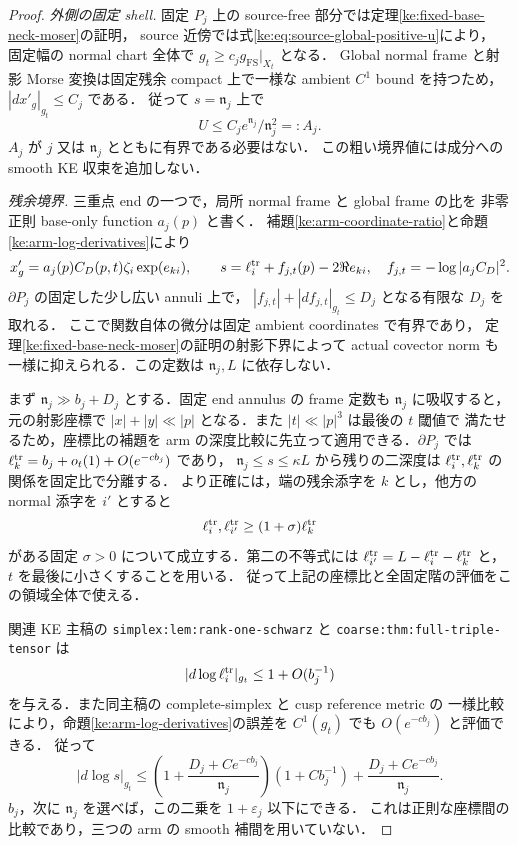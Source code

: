 \begin{proof}
\emph{外側の固定 shell.}
固定 $P_j$ 上の source-free 部分では定理\ref{ke:fixed-base-neck-moser}の証明，
source 近傍では式\eqref{ke:eq:source-global-positive-u}により，
固定幅の normal chart 全体で $g_t\ge c_jg_{\mathrm{FS}}|_{X_t}$ となる．
Global normal frame と射影 Morse 変換は固定残余 compact 上で一様な
ambient $C^1$ bound を持つため，$|dx'_g|_{g_t}\le C_j$ である．
従って $s=\mathfrak n_j$ 上で
\[
 U\le C_j e^{\mathfrak n_j}/\mathfrak n_j^2=:A_j.
\]
$A_j$ が $j$ 又は $\mathfrak n_j$ とともに有界である必要はない．
この粗い境界値には成分への smooth KE 収束を追加しない．

\emph{残余境界.}
三重点 end の一つで，局所 normal frame と global frame の比を
非零正則 base-only function $a_j(p)$ と書く．
補題\ref{ke:arm-coordinate-ratio}と命題\ref{ke:arm-log-derivatives}により
\[
 x'_g=a_j(p)C_D(p,t)\zeta_i\exp(e_{ki}),
 \qquad
 s=\ell_i^{\rm tr}+f_{j,t}(p)-2\Re e_{ki},
 \quad f_{j,t}=-\log|a_jC_D|^2.
\]
$\partial P_j$ の固定した少し広い annuli 上で，
$|f_{j,t}|+|df_{j,t}|_{g_t}\le D_j$ となる有限な $D_j$ を取れる．
ここで関数自体の微分は固定 ambient coordinates で有界であり，
定理\ref{ke:fixed-base-neck-moser}の証明の射影下界によって
actual covector norm も一様に抑えられる．この定数は $\mathfrak n_j,L$ に依存しない．

まず $\mathfrak n_j\gg b_j+D_j$ とする．固定 end annulus の frame 定数も $\mathfrak n_j$ に吸収すると，
元の射影座標で $|x|+|y|\ll|p|$ となる．また $|t|\ll|p|^3$ は最後の $t$ 閾値で
満たせるため，座標比の補題を arm の深度比較に先立って適用できる．$\partial P_j$ では
$\ell_k^{\rm tr}=b_j+o_t(1)+O(e^{-c b_j})$ であり，
$\mathfrak n_j\le s\le\kappa L$ から残りの二深度は
$\ell_i^{\rm tr},\ell_k^{\rm tr}$ の関係を固定比で分離する．
より正確には，端の残余添字を $k$ とし，他方の normal 添字を $i'$ とすると
\[
 \ell_i^{\rm tr},\ell_{i'}^{\rm tr}
 \ge(1+\sigma)\ell_k^{\rm tr}
\]
がある固定 $\sigma>0$ について成立する．第二の不等式には
$\ell_{i'}^{\rm tr}=L-\ell_i^{\rm tr}-\ell_k^{\rm tr}$ と，
$t$ を最後に小さくすることを用いる．
従って上記の座標比と全固定階の評価をこの領域全体で使える．

関連 KE 主稿\cite{KELocalCurrent}の
\texttt{simplex:lem:rank-one-schwarz} と
\texttt{coarse:thm:full-triple-tensor} は
\[
 |d\log\ell_i^{\rm tr}|_{g_t}\le1+O(b_j^{-1})
\]
を与える．また同主稿の complete-simplex と cusp reference metric の
一様比較により，命題\ref{ke:arm-log-derivatives}の誤差を
$C^1(g_t)$ でも $O(e^{-c b_j})$ と評価できる．
従って
\[
 |d\log s|_{g_t}
 \le \left(1+\frac{D_j+Ce^{-c b_j}}{\mathfrak n_j}\right)
             (1+Cb_j^{-1})
       +\frac{D_j+Ce^{-c b_j}}{\mathfrak n_j}.
\]
$b_j$，次に $\mathfrak n_j$ を選べば，この二乗を $1+\varepsilon_j$ 以下にできる．
これは正則な座標間の比較であり，三つの arm の smooth 補間を用いていない．


\end{proof}
